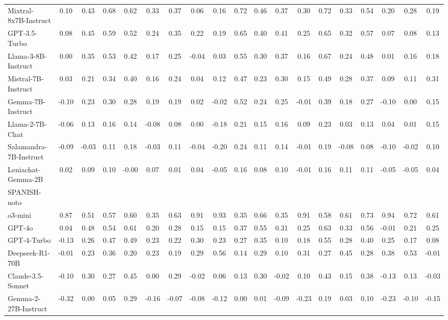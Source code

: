 \begin{table*}[ht]
{\begin{tabular}{lcccccccccccccccccc}
Mixtral-8x7B-Instruct & 0.10 & 0.43 & 0.68 & 0.62 & 0.33 & 0.37 & 0.06 & 0.16 & 0.72 & 0.46 & 0.37 & 0.30 & 0.72 & 0.33 & 0.54 & 0.20 & 0.28 & 0.19 \\
GPT-3.5-Turbo & 0.08 & 0.45 & 0.59 & 0.52 & 0.24 & 0.35 & 0.22 & 0.19 & 0.65 & 0.40 & 0.41 & 0.25 & 0.65 & 0.32 & 0.57 & 0.07 & 0.08 & 0.13 \\
Llama-3-8B-Instruct & 0.00 & 0.35 & 0.53 & 0.42 & 0.17 & 0.25 & -0.04 & 0.03 & 0.55 & 0.30 & 0.37 & 0.16 & 0.67 & 0.24 & 0.48 & 0.01 & 0.16 & 0.18 \\
Mistral-7B-Instruct & 0.03 & 0.21 & 0.34 & 0.40 & 0.16 & 0.24 & 0.04 & 0.12 & 0.47 & 0.23 & 0.30 & 0.15 & 0.49 & 0.28 & 0.37 & 0.09 & 0.11 & 0.31 \\
Gemma-7B-Instruct & -0.10 & 0.23 & 0.30 & 0.28 & 0.19 & 0.19 & 0.02 & -0.02 & 0.52 & 0.24 & 0.25 & -0.01 & 0.39 & 0.18 & 0.27 & -0.10 & 0.00 & 0.15 \\
Llama-2-7B-Chat & -0.06 & 0.13 & 0.16 & 0.14 & -0.08 & 0.08 & 0.00 & -0.18 & 0.21 & 0.15 & 0.16 & 0.09 & 0.23 & 0.03 & 0.13 & 0.04 & 0.01 & 0.15 \\
Salamandra-7B-Instruct & -0.09 & -0.03 & 0.11 & 0.18 & -0.03 & 0.11 & -0.04 & -0.20 & 0.24 & 0.11 & 0.14 & -0.01 & 0.19 & -0.08 & 0.08 & -0.10 & -0.02 & 0.10 \\
Leniachat-Gemma-2B & 0.02 & 0.09 & 0.10 & -0.00 & 0.07 & 0.01 & 0.04 & -0.05 & 0.16 & 0.08 & 0.10 & -0.01 & 0.16 & 0.11 & 0.11 & -0.05 & -0.05 & 0.04 \\
\midrule
SPANISH-noto &&&&&&&&&&&&\\
\midrule
o3-mini & 0.87 & 0.51 & 0.57 & 0.60 & 0.35 & 0.63 & 0.91 & 0.93 & 0.35 & 0.66 & 0.35 & 0.91 & 0.58 & 0.61 & 0.73 & 0.94 & 0.72 & 0.61 \\
GPT-4o & 0.04 & 0.48 & 0.54 & 0.61 & 0.20 & 0.28 & 0.15 & 0.15 & 0.37 & 0.55 & 0.31 & 0.25 & 0.63 & 0.33 & 0.56 & -0.01 & 0.21 & 0.25 \\
GPT-4-Turbo & -0.13 & 0.26 & 0.47 & 0.49 & 0.23 & 0.22 & 0.30 & 0.23 & 0.27 & 0.35 & 0.10 & 0.18 & 0.55 & 0.28 & 0.40 & 0.25 & 0.17 & 0.08 \\
Deepseek-R1-70B & -0.01 & 0.23 & 0.36 & 0.20 & 0.23 & 0.19 & 0.29 & 0.56 & 0.14 & 0.29 & 0.10 & 0.31 & 0.27 & 0.45 & 0.28 & 0.38 & 0.53 & -0.01 \\
Claude-3.5-Sonnet & -0.10 & 0.30 & 0.27 & 0.45 & 0.00 & 0.29 & -0.02 & 0.06 & 0.13 & 0.30 & -0.02 & 0.10 & 0.43 & 0.15 & 0.38 & -0.13 & 0.13 & -0.03 \\
Gemma-2-27B-Instruct & -0.32 & 0.00 & 0.05 & 0.29 & -0.16 & -0.07 & -0.08 & -0.12 & 0.00 & 0.01 & -0.09 & -0.23 & 0.19 & 0.03 & 0.10 & -0.23 & -0.10 & -0.15 \\

\end{tabular}}
\end{table*}
